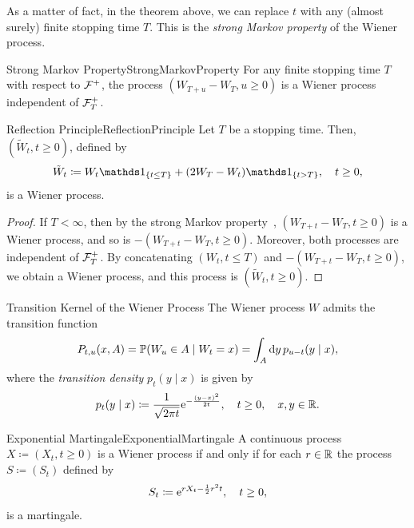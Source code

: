 As a matter of fact, in the theorem above, we can replace \(t\) with any (almost surely) finite stopping time \(T\). This is the \textit{strong Markov property} of the Wiener process.


\begin{thm}{Strong Markov Property}{StrongMarkovProperty}
	For any finite stopping time \(T\) with respect to \(\mathcal{F}^+\), the process \((W_{T+u} - W_T, u \ge 0)\) is a Wiener process independent of \(\mathcal{F}_T^+\).
\end{thm}

\begin{thm}{Reflection Principle}{ReflectionPrinciple}
	Let \(T\) be a stopping time. Then, \((\tilde{W}_t, t \ge 0)\), defined by
	\begin{equation}
		\tilde{W}_t \coloneqq W_t \I_{\{t \le T\}} + (2W_T - W_t) \I_{\{t > T\}}, \quad t \ge 0,
		\label{eq:ReflectionProcess}
	\end{equation}
	is a Wiener process.
\end{thm}

\begin{proof}
	If \(T < \infty\), then by the strong Markov property~, \((W_{T+t} - W_T, t \ge 0)\) is a Wiener process, and so is \(-(W_{T+t} - W_T, t \ge 0)\). Moreover, both processes are independent of \(\mathcal{F}_T^+\). By concatenating \((W_t, t \le T)\) and \(-(W_{T+t} - W_T, t \ge 0)\), we obtain a Wiener process, and this process is \((\tilde{W}_t, t \ge 0)\).
\end{proof}


\begin{thm}{Transition Kernel of the Wiener Process}{}
	The Wiener process \(W\) admits the transition function
	\begin{equation*}
		P_{t,u}(x, A) = \mathbb{P}(W_u \in A \mid W_t = x) = \int_A \mathrm{d} y \, p_{u-t}(y \mid x),
	\end{equation*}
	where the \textit{transition density} \(p_t(y \mid x)\) is given by
	\begin{equation}
		p_t(y \mid x) \coloneqq \frac{1}{\sqrt{2 \pi t}} \mathrm{e}^{-\frac{{(y-x)}^2}{2t}}, \quad t \ge 0, \quad x,y \in \mathbb{R}.
		\label{eq:WienerTransitionDensity}
	\end{equation}
\end{thm}

\begin{thm}{Exponential Martingale}{ExponentialMartingale}
	A continuous process \(X \coloneqq (X_t, t \ge 0)\) is a Wiener process if and only if for each \(r \in \mathbb{R}\) the process \(S \coloneqq (S_t)\) defined by
	\begin{equation}
		S_t \coloneqq \mathrm{e}^{r X_t - \frac{1}{2}r^2 t}, \quad t \ge 0,
		\label{eq:ExponentialMartingaleProcess}
	\end{equation}
	is a martingale.
\end{thm}


